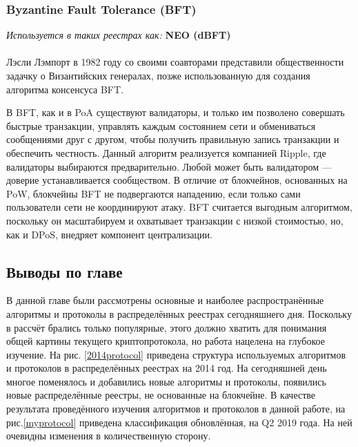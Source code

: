 \subsubsection{Byzantine Fault Tolerance (BFT)}
\emph{Используется в таких реестрах как: } \textbf{NEO (dBFT)} \\\\
Лэсли Лэмпорт в 1982 году \cite{Lamport2002} со своими соавторами представили
общественности задачку о Византийских генералах, позже использованную для
создания алгоритма консенсуса BFT.

В BFT, как и в PoA существуют валидаторы, и только им позволено совершать
быстрые транзакции, управлять каждым состоянием сети и обмениваться сообщениями
друг с другом, чтобы получить правильную запись транзакции и обеспечить
честность. Данный алгоритм реализуется компанией Ripple, где валидаторы
выбираются предварительно. Любой может быть валидатором --- доверие
устанавливается сообществом. В отличие от блокчейнов, основанных на PoW,
блокчейны BFT не подвергаются нападению, если только сами пользователи сети не
координируют атаку. BFT считается выгодным алгоритмом, поскольку он
масштабируем и охватывает транзакции с низкой стоимостью, но, как и DPoS,
внедряет компонент централизации.

\subsection{Выводы по главе}
В данной главе были рассмотрены основные и наиболее распространённые алгоритмы
и протоколы в распределённых реестрах сегодняшнего дня. Поскольку в рассчёт
брались только популярные, этого должно хватить для понимания общей картины
текущего криптопротокола, но работа нацелена на глубокое изучение. На рис.
\ref{2014protocol} \cite{TimSwanson2014} приведена структура используемых
алгоритмов и протоколов в распределённых реестрах на 2014 год. На сегодняшней
день многое поменялось и добавились новые алгоритмы и протоколы, появились
новые распределённые реестры, не основанные на блокчейне. В качестве
результата проведённого изучения алгоритмов и протоколов в данной работе, на
рис.\ref{myprotocol} приведена классификация обновлённая, на Q2 2019 года. На
ней очевидны изменения в количественную сторону.

\newpage

